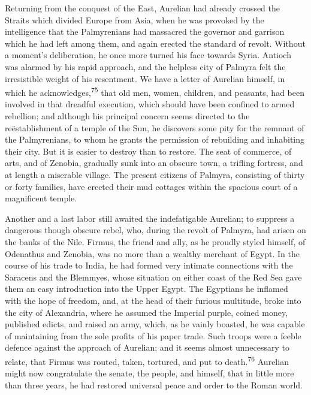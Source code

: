 Returning from the conquest of the East, Aurelian had already
crossed the Straits which divided Europe from Asia, when he was
provoked by the intelligence that the Palmyrenians had massacred
the governor and garrison which he had left among them, and again
erected the standard of revolt. Without a moment’s deliberation,
he once more turned his face towards Syria. Antioch was alarmed
by his rapid approach, and the helpless city of Palmyra felt the
irresistible weight of his resentment. We have a letter of
Aurelian himself, in which he acknowledges,\textsuperscript{75} that old men,
women, children, and peasants, had been involved in that dreadful
execution, which should have been confined to armed rebellion;
and although his principal concern seems directed to the
reëstablishment of a temple of the Sun, he discovers some pity
for the remnant of the Palmyrenians, to whom he grants the
permission of rebuilding and inhabiting their city. But it is
easier to destroy than to restore. The seat of commerce, of arts,
and of Zenobia, gradually sunk into an obscure town, a trifling
fortress, and at length a miserable village. The present citizens
of Palmyra, consisting of thirty or forty families, have erected
their mud cottages within the spacious court of a magnificent
temple.


Another and a last labor still awaited the indefatigable
Aurelian; to suppress a dangerous though obscure rebel, who,
during the revolt of Palmyra, had arisen on the banks of the
Nile. Firmus, the friend and ally, as he proudly styled himself,
of Odenathus and Zenobia, was no more than a wealthy merchant of
Egypt. In the course of his trade to India, he had formed very
intimate connections with the Saracens and the Blemmyes, whose
situation on either coast of the Red Sea gave them an easy
introduction into the Upper Egypt. The Egyptians he inflamed with
the hope of freedom, and, at the head of their furious multitude,
broke into the city of Alexandria, where he assumed the Imperial
purple, coined money, published edicts, and raised an army,
which, as he vainly boasted, he was capable of maintaining from
the sole profits of his paper trade. Such troops were a feeble
defence against the approach of Aurelian; and it seems almost
unnecessary to relate, that Firmus was routed, taken, tortured,
and put to death.\textsuperscript{76} Aurelian might now congratulate the senate,
the people, and himself, that in little more than three years, he
had restored universal peace and order to the Roman world.

